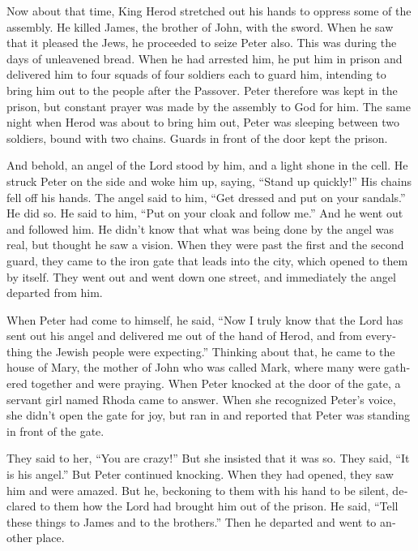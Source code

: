 \begin{paracol}{2}
\begin{otherlanguage}{english}
 Now about that time, King Herod stretched out his hands
to oppress some of the assembly.  He killed James, the
brother of John, with the sword.  When he saw that it
pleased the Jews, he proceeded to seize Peter also. This was during the
days of unleavened bread.  When he had arrested him, he
put him in prison and delivered him to four squads of four soldiers each
to guard him, intending to bring him out to the people after the
Passover.  Peter therefore was kept in the prison, but
constant prayer was made by the assembly to God for him. 
The same night when Herod was about to bring him out, Peter was sleeping
between two soldiers, bound with two chains. Guards in front of the door
kept the prison.

 And behold, an angel of the Lord stood by him, and a
light shone in the cell. He struck Peter on the side and woke him up,
saying, ``Stand up quickly!'' His chains fell off his hands.
 The angel said to him, ``Get dressed and put on your
sandals.'' He did so. He said to him, ``Put on your cloak and follow
me.''  And he went out and followed him. He didn't know
that what was being done by the angel was real, but thought he saw a
vision.  When they were past the first and the second
guard, they came to the iron gate that leads into the city, which opened
to them by itself. They went out and went down one street, and
immediately the angel departed from him.

 When Peter had come to himself, he said, ``Now I truly
know that the Lord has sent out his angel and delivered me out of the
hand of Herod, and from everything the Jewish people were expecting.''
 Thinking about that, he came to the house of Mary, the
mother of John who was called Mark, where many were gathered together
and were praying.  When Peter knocked at the door of the
gate, a servant girl named Rhoda came to answer.  When
she recognized Peter's voice, she didn't open the gate for joy, but ran
in and reported that Peter was standing in front of the gate.

 They said to her, ``You are crazy!'' But she insisted
that it was so. They said, ``It is his angel.''  But
Peter continued knocking. When they had opened, they saw him and were
amazed.  But he, beckoning to them with his hand to be
silent, declared to them how the Lord had brought him out of the prison.
He said, ``Tell these things to James and to the brothers.'' Then he
departed and went to another place.


\end{otherlanguage}
\end{paracol}
